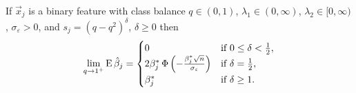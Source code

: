 \begin{theorem}
  \label{thm:classbalance-bias}
  If \(\vec{x}_j\) is a binary feature with class balance \(q \in (0, 1)\), \(\lambda_1 \in (0,\infty)\), \(\lambda_2 \in [0,\infty)\), \(\sigma_\varepsilon > 0\), and \(s_j = (q - q^2)^{\delta}\), \(\delta \geq 0\)  then
  \[
    \lim_{q \rightarrow 1^+} \operatorname{E} \hat{\beta}_j =
    \begin{cases}
      0                                                                           & \text{if } 0 \leq \delta < \frac{1}{2}, \\
      2 \beta_j^* \operatorname{\Phi}\left(-\frac{\beta_j^* \sqrt{n}}{\sigma_\varepsilon}\right) & \text{if } \delta = \frac{1}{2},        \\
      \beta^*_j                                                                   & \text{if } \delta \geq 1.
    \end{cases}
  \]
\end{theorem}

